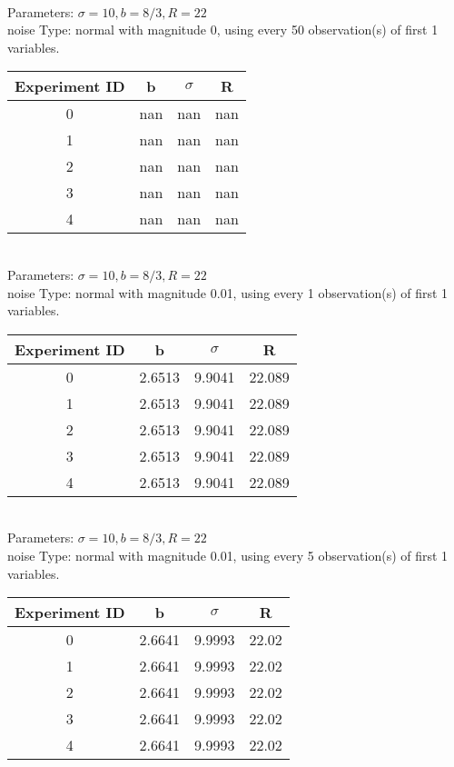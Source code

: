 \begin{multicols}{3}
\begin{tabular}{cccc}
 \end{tabular}\\
Parameters: $\sigma=10, b=8/3, R=22$\\
noise Type: normal with magnitude 0, using every 50 observation(s) of first 1 variables.\\
\begin{tabular}{cccc}
\hline Experiment ID & b & $\sigma$ & R \\ \hline 
0 & nan & nan & nan\\ \hline 
 1 & nan & nan & nan\\ \hline 
 2 & nan & nan & nan\\ \hline 
 3 & nan & nan & nan\\ \hline 
 4 & nan & nan & nan\\ \hline 
 \end{tabular}\\
Parameters: $\sigma=10, b=8/3, R=22$\\
noise Type: normal with magnitude 0.01, using every 1 observation(s) of first 1 variables.\\
\begin{tabular}{cccc}
\hline Experiment ID & b & $\sigma$ & R \\ \hline 
0 & 2.6513 & 9.9041 & 22.089\\ \hline 
 1 & 2.6513 & 9.9041 & 22.089\\ \hline 
 2 & 2.6513 & 9.9041 & 22.089\\ \hline 
 3 & 2.6513 & 9.9041 & 22.089\\ \hline 
 4 & 2.6513 & 9.9041 & 22.089\\ \hline 
 \end{tabular}\\
Parameters: $\sigma=10, b=8/3, R=22$\\
noise Type: normal with magnitude 0.01, using every 5 observation(s) of first 1 variables.\\
\begin{tabular}{cccc}
\hline Experiment ID & b & $\sigma$ & R \\ \hline 
0 & 2.6641 & 9.9993 & 22.02\\ \hline 
 1 & 2.6641 & 9.9993 & 22.02\\ \hline 
 2 & 2.6641 & 9.9993 & 22.02\\ \hline 
 3 & 2.6641 & 9.9993 & 22.02\\ \hline 
 4 & 2.6641 & 9.9993 & 22.02\\ \hline 
 \end{tabular}\\

\end{multicols}
